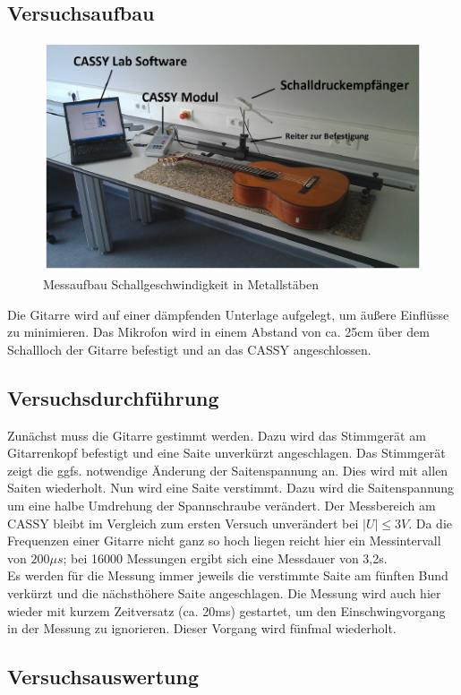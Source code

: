 \documentclass[12pt,a4paper]{article}
\begin{document}
\subsection{Versuchsaufbau}
\begin{figure}
\includegraphics[scale=1]{Bilder/AufbauAkustikGitarre.PNG}
\centering
\caption{Messaufbau Schallgeschwindigkeit in Metallstäben}
\label{GitarreAufbau}
\end{figure}
Die Gitarre wird auf einer dämpfenden Unterlage aufgelegt, um äußere Einflüsse zu minimieren. Das Mikrofon wird in einem Abstand von ca. 25cm über dem Schallloch der Gitarre befestigt und an das CASSY angeschlossen.
\subsection{Versuchsdurchführung}
\label{GitarreEinstellungen}
Zunächst muss die Gitarre gestimmt werden. Dazu wird das Stimmgerät am Gitarrenkopf befestigt und eine Saite unverkürzt angeschlagen. Das Stimmgerät zeigt die ggfs. notwendige Änderung der Saitenspannung an. Dies wird mit allen Saiten wiederholt. Nun wird eine Saite verstimmt. Dazu wird die Saitenspannung um eine halbe Umdrehung der Spannschraube verändert. Der Messbereich am CASSY bleibt im Vergleich zum ersten Versuch unverändert bei $|U| \leq 3V$. Da die Frequenzen einer Gitarre nicht ganz so hoch liegen reicht hier ein Messintervall von $200 \mu s$; bei 16000 Messungen ergibt sich eine Messdauer von 3,2s. \\
Es werden für die Messung immer jeweils die verstimmte Saite am fünften Bund verkürzt und die nächsthöhere Saite angeschlagen. Die Messung wird auch hier wieder mit kurzem Zeitversatz (ca. 20ms) gestartet, um den Einschwingvorgang in der Messung zu ignorieren. Dieser Vorgang wird fünfmal wiederholt.

\subsection{Versuchsauswertung}
\end{document}
